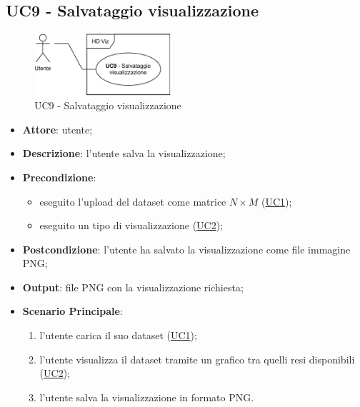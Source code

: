\subsection{UC9 - Salvataggio visualizzazione}
    \label{uc9}
    \begin{figure}[htbp]
        \centering
        \includegraphics[width=0.45\textwidth]{source/sections/casi-uso/diagrams/uc9.pdf}
        \caption{UC9 - Salvataggio visualizzazione}
        \label{fig:uc9}
    \end{figure}
    \begin{itemize}
    \item \textbf{Attore}: utente;
    \item \textbf{Descrizione}: l'utente salva la visualizzazione;
    \item \textbf{Precondizione}: 
    \begin{itemize}
        \item eseguito l'upload del dataset come matrice $N\times M$ (\hyperref[uc1]{UC1});
        \item eseguito un tipo di visualizzazione (\hyperref[uc2]{UC2});
    \end{itemize}  
    \item \textbf{Postcondizione}: l'utente ha salvato la visualizzazione come file immagine PNG;
    \item \textbf{Output}: file PNG con la visualizzazione richiesta;
    \item \textbf{Scenario Principale}: 
    \begin{enumerate}
        \item l'utente carica il suo dataset (\hyperref[uc1]{UC1});
        \item l'utente visualizza il dataset tramite un grafico tra quelli resi disponibili (\hyperref[uc2]{UC2});
        \item l'utente salva la visualizzazione in formato PNG.
    \end{enumerate}
    \end{itemize}